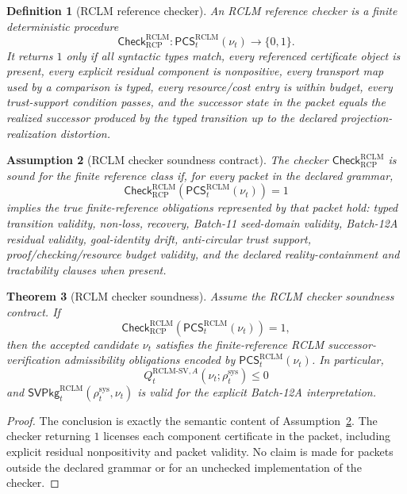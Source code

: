\documentclass[11pt,a4paper]{article}
\newtheorem{theorem}{Theorem}[section]
\newtheorem{definition}[theorem]{Definition}
\newtheorem{assumption}[theorem]{Assumption}
\newcommand{\RCP}{\mathrm{RCP}}
\newcommand{\RCLM}{\mathrm{RCLM}}
\newcommand{\sys}{\mathrm{sys}}
\begin{document}
\begin{definition}[RCLM reference checker]
\label{def:rclm-batch13r-reference-checker}
An RCLM reference checker is a finite deterministic procedure
\[
\mathsf{Check}_{\RCP}^{\RCLM}:
\mathsf{PCS}_t^{\RCLM}(\nu_t)\longrightarrow\{0,1\}.
\]
It returns \(1\) only if all syntactic types match, every referenced certificate object is present, every explicit residual component is nonpositive, every transport map used by a comparison is typed, every resource/cost entry is within budget, every trust-support condition passes, and the successor state in the packet equals the realized successor produced by the typed transition up to the declared projection-realization distortion.
\end{definition}

\begin{assumption}[RCLM checker soundness contract]
\label{ass:rclm-batch13r-checker-soundness-contract}
The checker \(\mathsf{Check}_{\RCP}^{\RCLM}\) is sound for the finite reference class if, for every packet in the declared grammar,
\[
\mathsf{Check}_{\RCP}^{\RCLM}(\mathsf{PCS}_t^{\RCLM}(\nu_t))=1
\]
implies the true finite-reference obligations represented by that packet hold: typed transition validity, non-loss, recovery, Batch-11 seed-domain validity, Batch-12A residual validity, goal-identity drift, anti-circular trust support, proof/checking/resource budget validity, and the declared reality-containment and tractability clauses when present.
\end{assumption}

\begin{theorem}[RCLM checker soundness]
\label{thm:rclm-batch13r-checker-soundness}
Assume the RCLM checker soundness contract.  If
\[
\mathsf{Check}_{\RCP}^{\RCLM}(\mathsf{PCS}_t^{\RCLM}(\nu_t))=1,
\]
then the accepted candidate \(\nu_t\) satisfies the finite-reference RCLM successor-verification admissibility obligations encoded by \(\mathsf{PCS}_t^{\RCLM}(\nu_t)\). In particular,
\[
Q_t^{\RCLM\text{-}\mathrm{SV},A}(\nu_t;\rho_t^{\sys})\le0
\]
and \(\mathsf{SVPkg}_t^{\RCLM}(\rho_t^{\sys},\nu_t)\) is valid for the explicit Batch-12A interpretation.
\end{theorem}

\begin{proof}
The conclusion is exactly the semantic content of Assumption~\ref{ass:rclm-batch13r-checker-soundness-contract}.  The checker returning \(1\) licenses each component certificate in the packet, including explicit residual nonpositivity and packet validity.  No claim is made for packets outside the declared grammar or for an unchecked implementation of the checker.
\end{proof}
\end{document}
